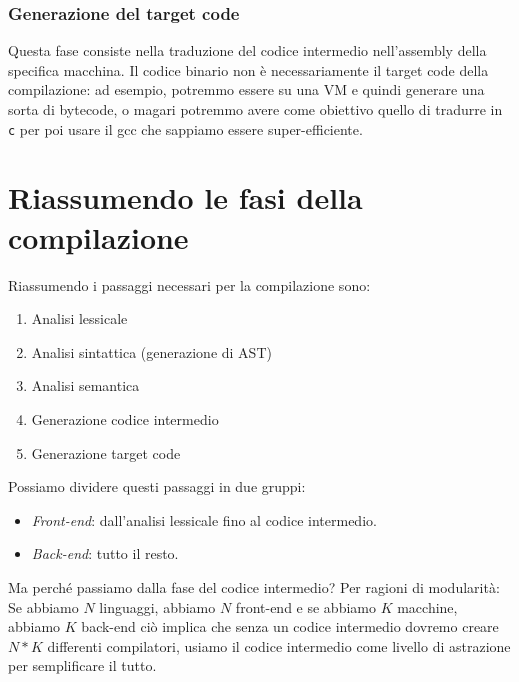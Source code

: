 \documentclass[class=book, crop=false, oneside, 12pt]{standalone}
\begin{document}
\subsubsection{Generazione del target code}
Questa fase consiste nella traduzione del codice intermedio nell'assembly della specifica macchina. Il codice binario non è necessariamente il target code della compilazione: ad esempio, potremmo essere su una VM e quindi generare una sorta di bytecode, o magari potremmo avere come obiettivo quello di tradurre in \texttt{c} per poi usare il gcc che sappiamo essere super-efficiente.

\section{Riassumendo le fasi della compilazione}
Riassumendo i passaggi necessari per la compilazione sono:
\begin{enumerate}
    \item Analisi lessicale
    \item Analisi sintattica (generazione di AST)
    \item Analisi semantica
    \item Generazione codice intermedio
    \item Generazione target code
\end{enumerate}
Possiamo dividere questi passaggi in due gruppi:
\begin{itemize}[]
    \item \emph{Front-end}: dall'analisi lessicale fino al codice intermedio.
    \item \emph{Back-end}: tutto il resto.
\end{itemize}
Ma perché passiamo dalla fase del codice intermedio? Per ragioni di modularità:
Se abbiamo \(N\) linguaggi, abbiamo \(N\) front-end e se abbiamo \(K\) macchine, abbiamo \(K\) back-end ciò implica che senza un codice intermedio dovremo creare \(N*K\) differenti compilatori, usiamo il codice intermedio come livello di astrazione per semplificare il tutto. 
\end{document}
